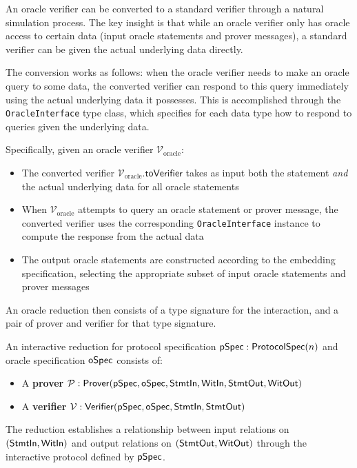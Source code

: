 \begin{definition}
    \label{def:oracle_verifier_to_verifier}
    An oracle verifier can be converted to a standard verifier through a natural simulation process. The key insight is that while an oracle verifier only has oracle access to certain data (input oracle statements and prover messages), a standard verifier can be given the actual underlying data directly.

    The conversion works as follows: when the oracle verifier needs to make an oracle query to some data, the converted verifier can respond to this query immediately using the actual underlying data it possesses. This is accomplished through the \texttt{OracleInterface} type class, which specifies for each data type how to respond to queries given the underlying data.

    Specifically, given an oracle verifier $\mathcal{V}_{\text{oracle}}$:
    \begin{itemize}
        \item The converted verifier $\mathcal{V}_{\text{oracle}}.\mathsf{toVerifier}$ takes as input both the statement \emph{and} the actual underlying data for all oracle statements
        \item When $\mathcal{V}_{\text{oracle}}$ attempts to query an oracle statement or prover message, the converted verifier uses the corresponding \texttt{OracleInterface} instance to compute the response from the actual data
        \item The output oracle statements are constructed according to the embedding specification, selecting the appropriate subset of input oracle statements and prover messages
    \end{itemize}
\end{definition}

An oracle reduction then consists of a type signature for the interaction, and a pair of prover and
verifier for that type signature.

\begin{definition}
    \label{def:reduction}
    An interactive reduction for protocol specification $\mathsf{pSpec} : \mathsf{ProtocolSpec}(n)$ and oracle specification $\mathsf{oSpec}$ consists of:
    \begin{itemize}
        \item A \textbf{prover} $\mathcal{P} : \mathsf{Prover}(\mathsf{pSpec}, \mathsf{oSpec}, \mathsf{StmtIn}, \mathsf{WitIn}, \mathsf{StmtOut}, \mathsf{WitOut})$
        \item A \textbf{verifier} $\mathcal{V} : \mathsf{Verifier}(\mathsf{pSpec}, \mathsf{oSpec}, \mathsf{StmtIn}, \mathsf{StmtOut})$
    \end{itemize}

    The reduction establishes a relationship between input relations on $(\mathsf{StmtIn}, \mathsf{WitIn})$ and output relations on $(\mathsf{StmtOut}, \mathsf{WitOut})$ through the interactive protocol defined by $\mathsf{pSpec}$.
\end{definition}

